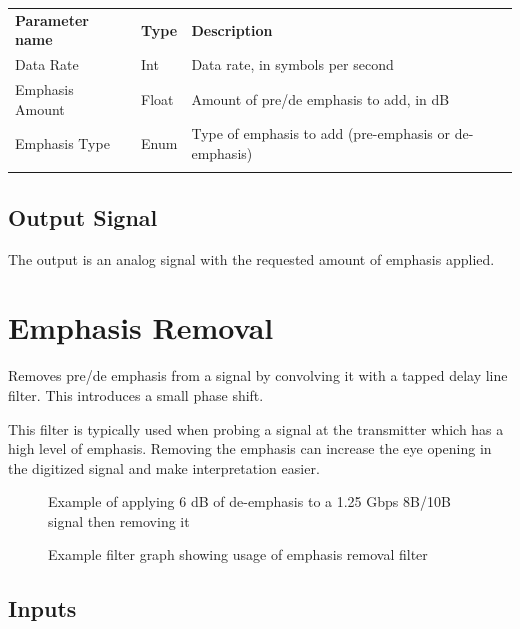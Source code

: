 \begin{tabularx}{16cm}{llX}
\thickhline
\textbf{Parameter name} & \textbf{Type} & \textbf{Description} \\
\thickhline
Data Rate & Int & Data rate, in symbols per second\\
\thinhline
Emphasis Amount & Float & Amount of pre/de emphasis to add, in dB\\
\thinhline
Emphasis Type & Enum & Type of emphasis to add (pre-emphasis or de-emphasis) \\
\thickhline
\end{tabularx}

\subsection{Output Signal}

The output is an analog signal with the requested amount of emphasis applied.

\pagebreak
\section{Emphasis Removal}
\label{filter:emphasisremoval}

Removes pre/de emphasis from a signal by convolving it with a tapped delay line filter. This introduces a small phase
shift.

This filter is typically used when probing a signal at the transmitter which has a high level of emphasis. Removing the
emphasis can increase the eye opening in the digitized signal and make interpretation easier.

\begin{figure}[h]
\centering
{}
\caption{Example of applying 6 dB of de-emphasis to a 1.25 Gbps 8B/10B signal then removing it}
\label{filter_emphasisremoval}
\end{figure}

\begin{figure}[h]
\centering
{}
\caption{Example filter graph showing usage of emphasis removal filter}
\label{filter_graph_emphasisremoval}
\end{figure}

\FloatBarrier

\subsection{Inputs}

